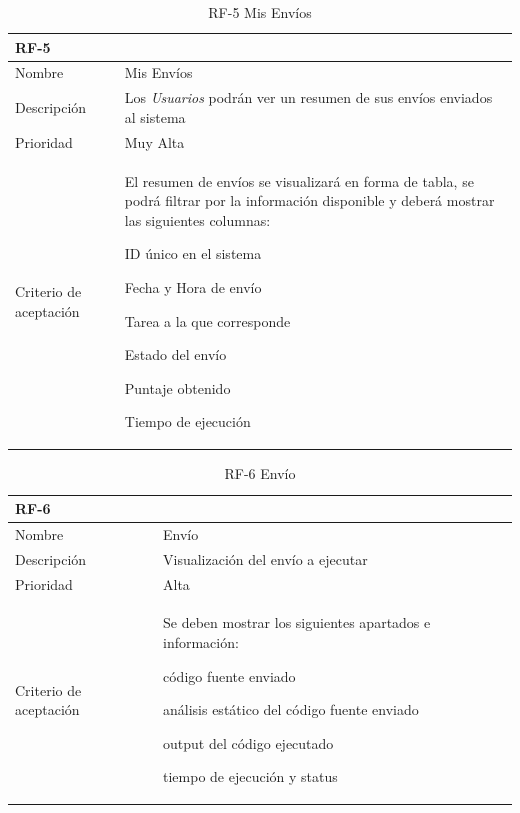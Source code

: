 \documentclass[11pt,spanish,listoffigures,listoftables]{tfgetsinf}
\begin{document}
\begin{table}
	\centering
	\begin{tabular}{ |p{4cm}||p{10cm}|  }
		\multicolumn{2}{l}{\textbf{RF-5}} \\
		\hline
		Nombre   & Mis Envíos \\
		\hline
		Descripción  & Los \textit{Usuarios} podrán ver un resumen de sus envíos enviados al sistema   \\
		\hline
		Prioridad &  Muy Alta\\
		\hline
		Criterio de aceptación & El resumen de envíos se visualizará en forma de tabla, se podrá filtrar por la información disponible y deberá mostrar las siguientes columnas: \newline
		\begin{tabitem}
			\item ID único en el sistema
			\item Fecha y Hora de envío
			\item Tarea a la que corresponde
			\item Estado del envío
			\item Puntaje obtenido
			\item Tiempo de ejecución
		\end{tabitem} \\
		\hline
	\end{tabular}
	\caption{RF-5 Mis Envíos}
	\label{table:5}
\end{table}

\begin{table}
	\centering
	\begin{tabular}{ |p{4cm}||p{10cm}|  }
		\multicolumn{2}{l}{\textbf{RF-6}} \\
		\hline
		Nombre   & Envío \\
		\hline
		Descripción  & Visualización del envío a ejecutar  \\
		\hline
		Prioridad &  Alta\\
		\hline
		Criterio de aceptación & Se deben mostrar los siguientes apartados e información: \newline  
		\begin{tabitem}
			\item código fuente enviado
			\item análisis estático del código fuente enviado
			\item output del código ejecutado
			\item tiempo de ejecución y status
		\end{tabitem} \\
		\hline
	\end{tabular}
	\caption{RF-6 Envío}
	\label{table:6}
\end{table}
\end{document}
